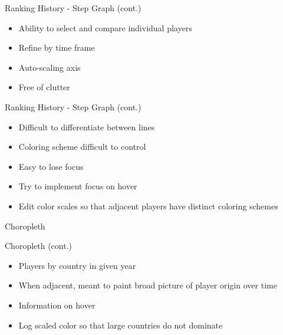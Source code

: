 \documentclass[ignorenonframetext,]{beamer}
\providecommand{\tightlist}{%
  \setlength{\itemsep}{0pt}\setlength{\parskip}{0pt}}
\begin{document}
\begin{frame}{Ranking History - Step Graph (cont.)}
\protect\hypertarget{ranking-history---step-graph-cont.-1}{}

\begin{itemize}[<+->]
\tightlist
\item
  Ability to select and compare individual players 
\item
  Refine by time frame 
\item
  Auto-scaling axis 
\item
  Free of clutter
\end{itemize}

\end{frame}

\begin{frame}{Ranking History - Step Graph (cont.)}
\protect\hypertarget{ranking-history---step-graph-cont.-2}{}

\begin{itemize}[<+->]
\tightlist
\item
  Difficult to differentiate between lines 
\item
  Coloring scheme difficult to control 
\item
  Easy to lose focus 
\item
  Try to implement focus on hover 
\item
  Edit color scales so that adjacent players have distinct coloring
  schemes
\end{itemize}

\end{frame}

\begin{frame}{Choropleth}
\protect\hypertarget{choropleth}{}

\end{frame}

\begin{frame}{Choropleth (cont.)}
\protect\hypertarget{choropleth-cont.}{}

\begin{itemize}[<+->]
\tightlist
\item
  Players by country in given year 
\item
  When adjacent, meant to paint broad picture of player origin over time
\item
  Information on hover 
\item
  Log scaled color so that large countries do not dominate
\end{itemize}

\end{frame}
\end{document}
